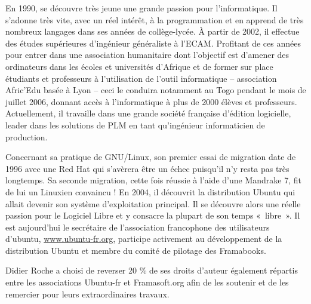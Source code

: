 En 1990,  se découvre très jeune une grande passion pour l'informatique. Il s'adonne très vite, avec un réel intérêt, à la programmation et en apprend de très nombreux langages dans ses années de collège-lycée. À partir de 2002, il effectue des études supérieures d'ingénieur généraliste à l'ECAM. Profitant de ces années pour entrer dans une association humanitaire dont l'objectif est d'amener des ordinateurs dans les écoles et universités d'Afrique et de former sur place étudiants et professeurs à l'utilisation de l'outil informatique -- association Afric'Edu basée à Lyon -- ceci le conduira notamment au Togo pendant le mois de juillet 2006, donnant accès à l'informatique à plus de 2000 élèves et professeurs. Actuellement, il travaille dans une grande société française d'édition logicielle, leader dans les solutions de PLM en tant qu'ingénieur informaticien de production.\par
Concernant sa pratique de GNU/Linux, son premier essai de migration date de 1996 avec une Red Hat qui s'avèrera être un échec puisqu'il n'y resta pas très longtemps. Sa seconde migration, cette fois réussie à l'aide d'une Mandrake 7, fit de lui un Linuxien convaincu ! En 2004, il découvrit la distribution Ubuntu qui allait devenir son système d'exploitation principal. Il se découvre alors une réelle passion pour le Logiciel Libre et y consacre la plupart de son temps «~libre~». Il est aujourd'hui le secrétaire de l'association francophone des utilisateurs d'ubuntu, \url{www.ubuntu-fr.org}, participe activement au développement de la distribution Ubuntu et membre du comité de pilotage des Framabooks.\par
Didier Roche a choisi de reverser 20 \% de ses droits d'auteur également répartis entre les associations Ubuntu-fr et Framasoft.org afin de les soutenir et de les remercier pour leurs extraordinaires travaux.\par
